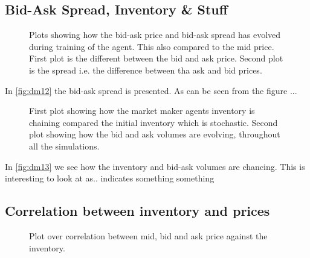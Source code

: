 \documentclass{kththesis}
\theoremstyle{definition}
\begin{document}
\subsection*{Bid-Ask Spread, Inventory \& Stuff}
\begin{figure}[H]
	    	\centering
		
		\caption{Plots showing how the bid-ask price and bid-ask spread has evolved during training of the agent. This also compared to the mid price. First plot is the different between the bid and ask price. Second plot is the spread i.e. the difference between tha ask and bid prices.}
		\label{fig:dm12}
\end{figure}
In \autoref{fig:dm12} the bid-ask spread is presented. As can be seen from the figure ...

\begin{figure}[H]
	    	\centering
		
		\caption{First plot showing how the market maker agents inventory is chaining compared the initial inventory which is stochastic. Second plot showing how the bid and ask volumes are evolving,  throughout all the simulations.}
		\label{fig:dm13}
\end{figure}

In \autoref{fig:dm13} we see how the inventory and bid-ask volumes are chancing. This is interesting to look at as.. indicates something something

\subsection*{Correlation between inventory and prices}

\begin{figure}[H]
	    	\centering
		
		\caption{Plot over correlation between mid, bid and ask price against the inventory.}
		\label{fig:dm14}
\end{figure}
\end{document}
